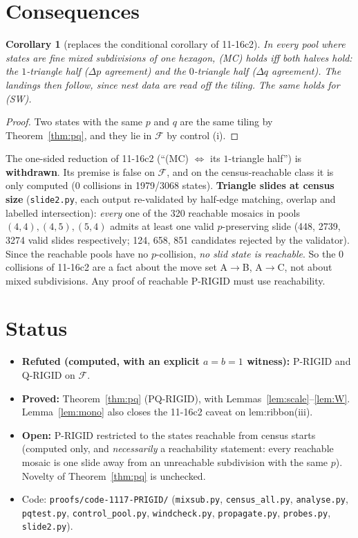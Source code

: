 \documentclass[11pt]{article}
\newtheorem{corollary}[theorem]{Corollary}
\theoremstyle{definition}
\begin{document}
\section{Consequences}
\begin{corollary}[replaces the conditional corollary of 11-16c2]
In every pool where states are fine mixed subdivisions of one hexagon, (MC) holds iff \emph{both} halves hold: the $1$-triangle half
($\Delta p$ agreement) and the $0$-triangle half ($\Delta q$ agreement). The landings then follow, since nest data are read off the tiling. The same holds for (SW).
\end{corollary}
\begin{proof}Two states with the same $p$ and $q$ are the same tiling by Theorem~\ref{thm:pq}, and they lie in $\mathcal F$ by control (i).\end{proof}
The one-sided reduction of 11-16c2 (``(MC) $\iff$ its $1$-triangle half'') is \textbf{withdrawn}. Its premise is false on $\mathcal F$, and on the census-reachable class it is only
computed (0 collisions in 1979/3068 states). \textbf{Triangle slides at census size} (\texttt{slide2.py}, each output re-validated by half-edge matching, overlap and labelled intersection):
\emph{every} one of the 320 reachable mosaics in pools $(4,4),(4,5),(5,4)$ admits at least one valid $p$-preserving slide (448, 2739, 3274 valid slides
respectively; 124, 658, 851 candidates rejected by the validator). Since the reachable pools have no $p$-collision, \emph{no slid state is reachable}. So the 0 collisions
of 11-16c2 are a fact about the move set A$\to$B, A$\to$C, not about mixed subdivisions. Any proof of reachable P-RIGID must use reachability.

\section{Status}
\begin{itemize}
\item \textbf{Refuted (computed, with an explicit $a=b=1$ witness):} P-RIGID and Q-RIGID on $\mathcal F$.
\item \textbf{Proved:} Theorem~\ref{thm:pq} (PQ-RIGID), with Lemmas~\ref{lem:scale}--\ref{lem:W}. Lemma~\ref{lem:mono} also closes the 11-16c2 caveat on lem:ribbon(iii).
\item \textbf{Open:} P-RIGID restricted to the states reachable from census starts (computed only, and \emph{necessarily} a reachability statement: every reachable mosaic is one slide away from an unreachable subdivision with the same $p$). Novelty of Theorem~\ref{thm:pq} is unchecked.
\item Code: \texttt{proofs/code-1117-PRIGID/} (\texttt{mixsub.py}, \texttt{census\_all.py}, \texttt{analyse.py}, \texttt{pqtest.py}, \texttt{control\_pool.py},
\texttt{windcheck.py}, \texttt{propagate.py}, \texttt{probes.py}, \texttt{slide2.py}).
\end{itemize}
\end{document}
